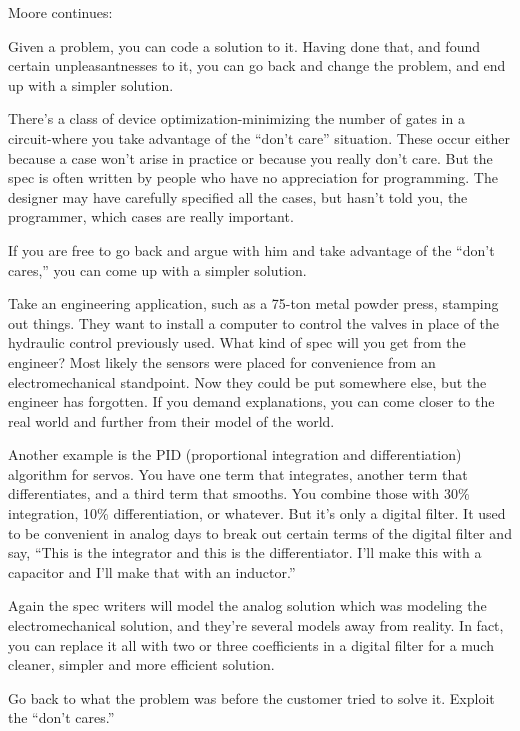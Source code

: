 \bigskip\blackline{2ex}
\noindent Moore continues:
\begin{tfquot}

\noindent Given a problem, you can code a solution to it. Having done that, and found
certain unpleasantnesses to it, you can go back and change the problem,
and end up with a simpler solution.

There's a class of device optimization-minimizing the number of gates in a
circuit-where you take advantage of the ``don't care'' situation. These
occur either because a case won't arise in practice or because you really
don't care. But the spec is often written by people who have no appreciation
for programming. The designer may have carefully specified all the cases,
but hasn't told you, the programmer, which cases are really important.

If you are free to go back and argue with him and take advantage of the
``don't cares,'' you can come up with a simpler solution.

Take an engineering application, such as a 75-ton metal powder press,
stamping out things. They want to install a computer to control the valves
in place of the hydraulic control previously used. What kind of spec will you
get from the engineer? Most likely the sensors were placed for convenience
from an electromechanical standpoint. Now they could be put somewhere
else, but the engineer has forgotten. If you demand explanations, you can
come closer to the real world and further from their model of the world.

Another example is the PID (proportional integration and differentiation)
algorithm for servos. You have one term that integrates, another term that
differentiates, and a third term that smooths. You combine those with
30\% integration, 10\% differentiation, or whatever. But it's only a digital
filter. It used to be convenient in analog days to break out certain terms of
the digital filter and say, ``This is the integrator and this is the
differentiator. I'll make this with a capacitor and I'll make that with an inductor.''

Again the spec writers will model the analog solution which was modeling
the electromechanical solution, and they're several models away from
reality. In fact, you can replace it all with two or three coefficients in a digital
filter for a much cleaner, simpler and more efficient solution.
\end{tfquot}
\blackline{1ex}

\begin{tip}
Go back to what the problem was before the customer tried to solve it.
Exploit the ``don't cares.''
\end{tip}

